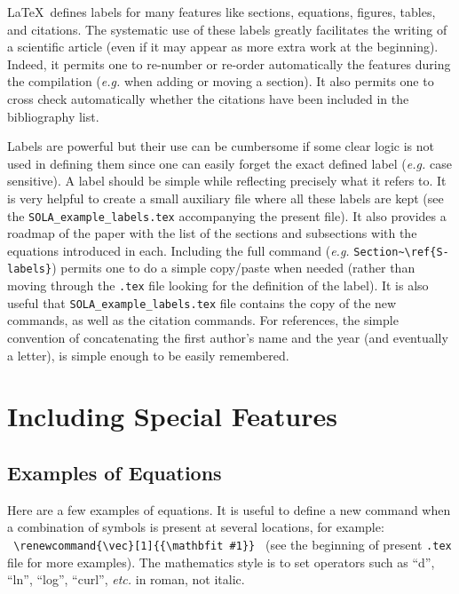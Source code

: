 \documentclass[namedreferences]{solarphysics}
\renewcommand{\vec}[1]{{\mathbfit #1}}
\begin{document}
\begin{article}
{  %
    \LaTeX\ defines labels for many features like sections, 
equations, figures, tables, and citations.  The systematic use
of these labels greatly facilitates the writing of a scientific
article (even if it may appear as more extra work at the beginning).
Indeed, it permits one to re-number or re-order automatically the
features during the compilation ({\it e.g.} when adding or moving a 
section).  It also permits one to
cross check automatically whether the citations have been included
in the bibliography list.

    Labels are powerful but their use can be cumbersome if some
clear logic is not used in defining them since one can easily
forget the exact defined label ({\it e.g.} case sensitive).
A label should be simple
while reflecting precisely what it refers to. It is very helpful
to create a small auxiliary file where all these labels are
kept (see the \verb+SOLA_example_labels.tex+ 
accompanying the present file).   
It also provides a roadmap of the paper with the list
of the sections and subsections with the equations introduced in each.     
Including the full command ({\it e.g.} \verb+Section~\ref{S-labels}+)
permits one to do a simple copy/paste when needed (rather than moving
through the \texttt{.tex} file looking for the definition of the label). 
It is also useful that  
\verb+SOLA_example_labels.tex+   file contains the copy of the 
new commands, as well as the citation commands. For references,
the simple convention of concatenating the first author's name and the year
(and eventually a letter), is simple enough to be easily remembered.
    
\section{Including Special Features} %
      \label{S-features}      

\subsection{Examples of Equations} %
  \label{S-equations}
Here are a few examples of equations. It is useful to define
a new command when a combination of symbols is present at several 
locations, for example:\\
  \verb+ \renewcommand{\vec}[1]{{\mathbfit #1}} + 
(see the beginning of present \texttt{.tex} file for more examples). 
The mathematics style is to set operators such as ``d'', ``ln'', ``log'', 
``curl'', \textit{etc.} in roman, not italic.

}
\end{article}
\end{document}
